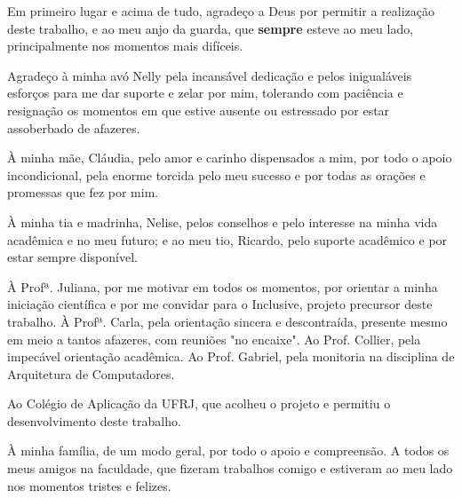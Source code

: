 Em primeiro lugar e acima de tudo, agradeço a Deus por permitir a realização deste trabalho, e ao meu anjo da guarda, que \textbf{sempre} esteve ao meu lado, principalmente nos momentos mais difíceis.

Agradeço à minha avó Nelly pela incansável dedicação e pelos inigualáveis esforços para me dar suporte e zelar por mim, tolerando com paciência e resignação os momentos em que estive ausente ou estressado por estar assoberbado de afazeres.

À minha mãe, Cláudia, pelo amor e carinho dispensados a mim, por todo o apoio incondicional, pela enorme torcida pelo meu sucesso e por todas as orações e promessas que fez por mim.

À minha tia e madrinha, Nelise, pelos conselhos e pelo interesse na minha vida acadêmica e no meu futuro; e ao meu tio, Ricardo, pelo suporte acadêmico e por estar sempre disponível.

À Profª. Juliana, por me motivar em todos os momentos, por orientar a minha iniciação científica e por me convidar para o Inclusive, projeto precursor deste trabalho. À Profª. Carla, pela orientação sincera e descontraída, presente mesmo em meio a tantos afazeres, com reuniões "no encaixe". Ao Prof. Collier, pela impecável orientação acadêmica. Ao Prof. Gabriel, pela monitoria na disciplina de Arquitetura de Computadores.

Ao Colégio de Aplicação da UFRJ, que acolheu o projeto e permitiu o desenvolvimento deste trabalho.

À minha família, de um modo geral, por todo o apoio e compreensão. A todos os meus amigos na faculdade, que fizeram trabalhos comigo e estiveram ao meu lado nos momentos tristes e felizes.